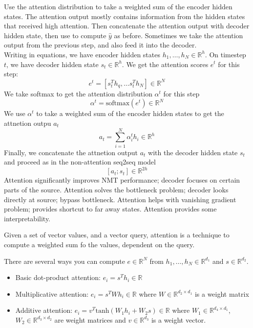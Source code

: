 \documentclass{article}
\begin{document}
Use the attention distribution to take a weighted sum of the encoder hidden states. The attention output mostly contains information from the hidden states that received high attention. Then concatenate the attention output with decoder hidden state, then use to compute $\hat{y}$ as before. Sometimes we take the attention output from the previous step, and also feed it into the decoder. \\ 

Writing  in equations, we have encoder hidden states $h_1 , \dots , h_N \in \mathbb{R}^{h}$. On timestep $t$, we have decoder hidden state $s_t \in \mathbb{R}^h$. We get the attention scores $e^t$ for this step: $$e^t = [s_t^T h_q , \dots s_t^T h_N] \in \mathbb{R}^N$$ We take softmax to get the attention distribution $\alpha^t$ for this step $$\alpha^t = \textrm{softmax}(e^t) \in \mathbb{R}^N$$ We use $\alpha^t$ to take a weighted sum of the encoder hidden states to get the attnetion outpu $a_t$ $$a_t = \sum_{i=1}^N \alpha_i^t h_i \in \mathbb{R}^h$$ Finally, we concatenate the attnetion output $a_t$ with the decoder hidden state $s_t$ and proceed as in the non-attention seq2seq model $$[a_t ; s_t] \in \mathbb{R}^{2h}$$ Attention significantly improves NMT performance; decoder focuses on certain parts of the source. Attention solves the bottleneck problem; decoder looks directly at source; bypass bottleneck. Attention helps with vanishing gradient problem; provides shortcut to far away states. Attention provides some interpretability. 

\begin{definition}
  Given a set of vector values, and a vector query, attention is a technique to compute a weighted sum fo the values, dependent on the query. 
\end{definition}

There are several ways you can compute $e \in \mathbb{R}^N$ from $h_1 , \dots , h_N \in \mathbb{R}^{d_1}$ and $s \in \mathbb{R}^{d_2}$. 
\begin{itemize}
  \item Basic dot-product attention: $e_i = s^T h_i \in \mathbb{R}$ 
  \item Multiplicative attention: $e_i = s^T W h_i \in \mathbb{R}$ where $W \in \mathbb{R}^{d_2 \times d_1}$ is a weight matrix
  \item Additive attention: $e_i = v^T \textrm{tanh}(W_1 h_i + W_2 s) \in \mathbb{R}$ where $W_1 \in \mathbb{R}^{d_4 \times d_1}$, $W_2 \in \mathbb{R}^{d_3 \times d_2}$ are weight matrices and $v \in \mathbb{R}^{d_3}$ is a weight vector. 
\end{itemize}
\end{document}

